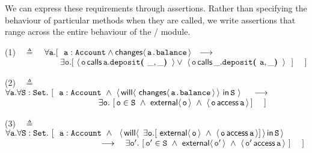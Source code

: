  
We can  express these  requirements  %
through \Chainmail assertions.  Rather than %
specifying the behaviour of particular methods when they are called, we
write  assertions   that range across the entire behaviour of the
/  module.%
\vspace{.2cm}


(1)\ \  $\triangleq$\ \ $\forall \prg{a}.[\ \ \prg{a}:\prg{Account} \wedge \Changes{\prg{a.balance}}  \ \    
    \longrightarrow \ \    \hfill$ \\
  $\strut \hspace{2.3cm} 
  \exists \prg{o}. [\    \Calls{\prg{o}}{\prg{deposit}}{\prg{a}}{\_,\_} \vee\  \Calls{\prg{o}}{\prg{deposit}}{\_}{\prg{a},\_}\  \ ] \ \ \ \ ] \hfill $

\vspace{.4cm}

    (2)\ \  $\triangleq$\ \ $\forall {\mbox{\tt{a}}}.\forall {\mbox{\tt{S}}}:{\mbox{\tt{Set}}}.\ [  \ \  {\mbox{\tt{a}}}:{\mbox{\tt{Account}}}\ \wedge \  \langle\,  {\mathsf{will}}\langle \,\,{\mathsf{changes}}\langle\,{\mbox{\tt{a.balance}}}\,\rangle\,\rangle \,\, \mathsf{in}\, {\mbox{\tt{S}}}\,\, \rangle\ \ \   \
    \longrightarrow$ \\
 $\strut \hspace{3.9cm} \hfill \exists \prg{o}.\ [\, \prg{o}\in \prg{S}\ \wedge\  \External{\prg{o}}  \ \wedge \ \CanAccess{\prg{o}}{\prg{a}} \, ] \ \ \ \ ]$
\vspace{.4cm} 
 
     (3)\ \  $\triangleq$\ \ $\forall {\mbox{\tt{a}}}.\forall {\mbox{\tt{S}}}:{\mbox{\tt{Set}}}.\ [ \ \  {\mbox{\tt{a}}}:{\mbox{\tt{Account}}}\ \wedge \ \ {\langle\, {\mathsf{will}}\langle \,\ \exists {\mbox{\tt{o}}}.[\ {\mathsf{external}}\langle\, {\mbox{\tt{o}}}\, \rangle \ \wedge\ \langle\, {\mbox{\tt{o}}}\, \mathsf{access}\, {\mbox{\tt{a}}}\, \rangle]\,\rangle\, \mathsf{in}\, {{\mbox{\tt{S}}}}\, \rangle}$ \\  
 $\strut \hspace{3.9cm} \hfill   \longrightarrow \ \ \ \exists \prg{o}'.\ [\, \prg{o}'\in \prg{S}\  \wedge  \ \External{\prg{o}'}  \ \wedge \ \CanAccess{\prg{o}'}{\prg{a}}   \ ] \ \ \ \ ]$

\vspace{.2cm}

